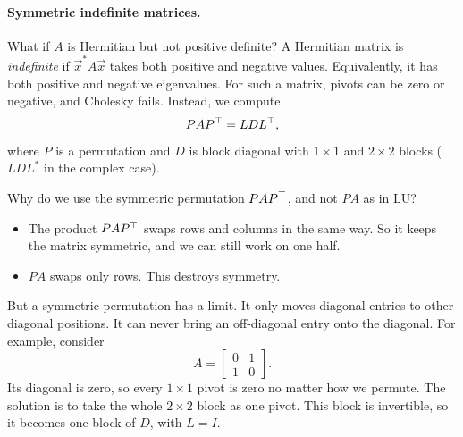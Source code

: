 \clearpage
\paragraph{Symmetric indefinite matrices.} What if $A$ is Hermitian but not positive definite? A Hermitian matrix is \emph{indefinite} if $\vec{x}^\ast A\vec{x}$ takes both positive and negative values. Equivalently, it has both positive and negative eigenvalues. For such a matrix, pivots can be zero or negative, and Cholesky fails. Instead, we compute
\begin{equation}
  PAP^\top = LDL^\top,
\end{equation}
where $P$ is a permutation and $D$ is block diagonal with $1 \times 1$ and $2 \times 2$ blocks ($LDL^\ast$ in the complex case).

Why do we use the symmetric permutation $PAP^\top$, and not $PA$ as in LU?
\begin{itemize}
  \item The product $PAP^\top$ swaps rows and columns in the same way. So it keeps the matrix symmetric, and we can still work on one half.
  \item $PA$ swaps only rows. This destroys symmetry.
\end{itemize}
But a symmetric permutation has a limit. It only moves diagonal entries to other diagonal positions. It can never bring an off-diagonal entry onto the diagonal. For example, consider
\begin{equation}
  A = \begin{bmatrix} 0 & 1 \\ 1 & 0 \end{bmatrix}.
\end{equation}
Its diagonal is zero, so every $1 \times 1$ pivot is zero no matter how we permute. The solution is to take the whole $2 \times 2$ block as one pivot. This block is invertible, so it becomes one block of $D$, with $L = I$.

